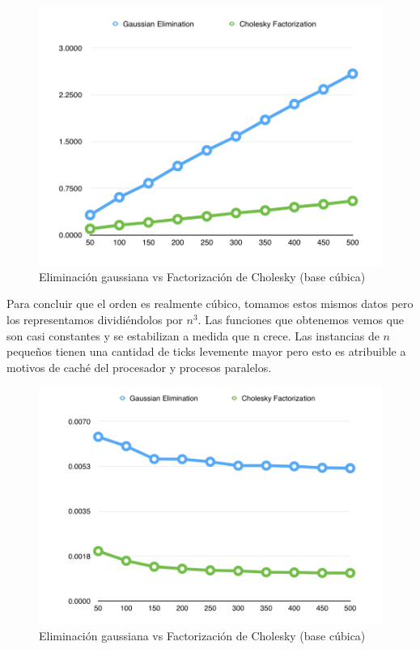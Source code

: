 \begin{figure}[h!]
  \begin{center}
	\includegraphics[scale=0.50]{imagenes/cuantitative/default/default2.png}
	\caption{Eliminaci\'on gaussiana vs Factorizaci\'on de Cholesky (base c\'ubica)}
  \end{center}
\end{figure}
\newpage

Para concluir que el orden es realmente c\'ubico, tomamos estos mismos datos pero los representamos dividi\'endolos por $n^{3}$. Las funciones que obtenemos vemos que son casi constantes y se estabilizan a medida que n crece. Las instancias de $n$ pequeños tienen una cantidad de ticks levemente mayor pero esto es atribuible a motivos de cach\'e del procesador y procesos paralelos.

\begin{figure}[h!]
  \begin{center}
	\includegraphics[scale=0.50]{imagenes/cuantitative/default/default3.png}
	\caption{Eliminaci\'on gaussiana vs Factorizaci\'on de Cholesky (base c\'ubica)}
  \end{center}
\end{figure}
\newpage